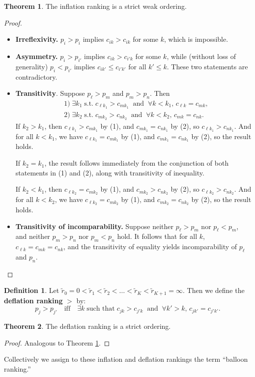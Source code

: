 \documentclass[11pt, oneside, fleqn, UTF8]{article} 	%
\theoremstyle{definition}
\newtheorem{defn}{Definition}
\newtheorem{theorem}{Theorem}
\newcommand{\st}{\; \text{s.t.} \;}
\newcommand{\tr}[0]{\tilde{r}}
\begin{document}
\begin{theorem} \label{inflationStrictOrdering}
The inflation ranking is a strict weak ordering.
\end{theorem}
\begin{proof}
\hfill
\begin{itemize}
\item \textbf{Irreflexivity.} $p_i > p_{i}$ implies $c_{ik} > c_{ik}$ for some $k$, which is impossible.
\item \textbf{Asymmetry.} $p_i > p_{i'}$ implies $c_{ik} > c_{i'k}$ for some $k$, while (without loss of generality) $p_i < p_{i'}$ implies $c_{ik'} \leq c_{i'k'}$ for all $k' \leq k$. These two statements are contradictory.
\item \textbf{Transitivity}.  Suppose $p_{\ell} > p_m$ and $p_m > p_n$.  Then
\begin{align*}
& 1) \; \exists k_1 \st c_{\ell k_1} > c_{m k_1} \; \; \text{and} \; \; \forall k < k_1, \, c_{\ell k} = c_{mk}, \\
& 2) \; \exists k_2 \st c_{m k_2} > c_{n k_2} \; \; \text{and} \; \; \forall k < k_2, \, c_{mk} = c_{nk}.
\end{align*}
If $k_2 > k_1$, then $c_{\ell k_1} > c_{m k_1}$ by (1), and $c_{m k_1} = c_{n k_1}$ by (2), so $c_{\ell k_1} > c_{n k_1}$.  And for all $k < k_1$, we have $c_{\ell k_1} = c_{m k_1}$ by (1), and $c_{m k_1} = c_{n k_1}$ by (2), so the result holds.

If $k_2 = k_1$, the result follows immediately from the conjunction of both statements in (1) and (2), along with transitivity of inequality.

If $k_2 < k_1$, then $c_{\ell k_2} = c_{m k_2}$ by (1), and $c_{m k_2} > c_{n k_2}$ by (2), so $c_{\ell k_2} > c_{n k_2}$.  And for all $k < k_2$, we have $c_{\ell k_2} = c_{m k_2}$ by (1), and $c_{m k_2} = c_{n k_2}$ by (2), so the result holds.
\item \textbf{Transitivity of incomparability.}  Suppose neither $p_{\ell} > p_m$ nor $p_{\ell} < p_m$, and neither $p_m > p_n$ nor $p_m < p_n$ hold.  It follows that for all $k$, $c_{\ell k} = c_{mk} = c_{nk}$, and the transitivity of equality yields incomparability of $p_{\ell}$ and $p_n$.
\end{itemize}
\end{proof}
\hfill
\begin{defn}
Let $\tr_0 = 0 < \tr_1 < \tr_2 < \ldots < \tr_K < \tr_{K+1} = \infty$.  Then we define the \textbf{deflation ranking} $>$  by:
$$ p_j > p_{j'} \quad \text{iff} \quad \exists k \; \text{such that} \; c_{jk} > c_{j'k} \; \; \text{and} \; \; \forall k' > k, \, c_{jk'} = c_{j'k'}. $$
\end{defn}
\begin{theorem}
The deflation ranking is a strict ordering.
\end{theorem}
\begin{proof}
Analogous to Theorem \ref{inflationStrictOrdering}.
\end{proof}
Collectively we assign to these inflation and deflation rankings the term ``balloon ranking.''
\end{document}

